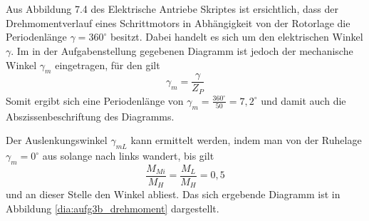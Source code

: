 \chapter{}\label{ex:aufg3}

\section{}\label{sec:aufg3a}

\section{}\label{sec:aufg3b}
Aus Abbildung 7.4 des Elektrische Antriebe Skriptes ist ersichtlich, dass der Drehmomentverlauf eines Schrittmotors in Abhängigkeit von der Rotorlage die Periodenlänge $\gamma = 360^\circ$ besitzt. Dabei handelt es sich um den elektrischen Winkel $\gamma$. Im in der Aufgabenstellung gegebenen Diagramm ist jedoch der mechanische Winkel $\gamma_m$ eingetragen, für den gilt
\begin{equation}
    \gamma_m = \frac{\gamma}{Z_P}
\end{equation}
Somit ergibt sich eine Periodenlänge von $\gamma_m = \frac{360^\circ}{50} = 7,2^\circ$ und damit auch die Abszissenbeschriftung des Diagramms.

Der Auslenkungswinkel $\gamma_{mL}$ kann ermittelt werden, indem man von der Ruhelage $\gamma_m = 0^\circ$ aus solange nach links wandert, bis gilt
\begin{equation}
    \frac{M_{Mi}}{M_H} = \frac{M_L}{M_H} = 0,5
\end{equation}
und an dieser Stelle den Winkel abliest.
Das sich ergebende Diagramm ist in Abbildung \ref{dia:aufg3b_drehmoment} dargestellt.




\clearpage